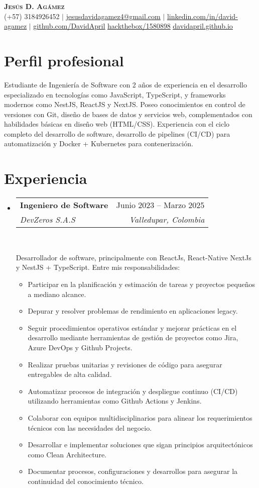 \documentclass[letterpaper,11pt]{article}
\makeatletter
\newcommand{\resumeItem}[1]{
  \item\small{
    {#1 \vspace{-2pt}}
  }
}
\newcommand{\resumeSubheading}[4]{
  \vspace{-2pt}\item
    \begin{tabular*}{0.97\textwidth}[t]{l@{\extracolsep{\fill}}r}
      \textbf{#1} & #2 \\
      \textit{\small#3} & \textit{\small #4} \\
    \end{tabular*}\vspace{-7pt}
}
\newcommand{\resumeSubHeadingListStart}{\begin{itemize}[leftmargin=0.15in, label={}]}
\newcommand{\resumeSubHeadingListEnd}{\end{itemize}}
\newcommand{\resumeItemListStart}{\begin{itemize}}
\newcommand{\resumeItemListEnd}{\end{itemize}\vspace{-5pt}}
\makeatother
\begin{document}
\begin{center}
    \textbf{\Huge \scshape Jesús D. Agámez} \\ \vspace{1pt}
    \small (+57) 3184926452 $|$ \href{mailto:jesusdavidagamez4@gmail.com}{\underline{jesusdavidagamez4@gmail.com}} $|$ 
    \href{https://linkedin.com/in/david-agamez}{\underline{linkedin.com/in/david-agamez}} $|$
    \href{https://github.com/DavidApril}{\underline{github.com/DavidApril}}
    \href{https://app.hackthebox.com/profile/1580898}{\underline{hackthebox/1580898}}
    \href{https://davidapril.github.io}{\underline{davidapril.github.io}}
\end{center}

\section{Perfil profesional}
    \par
    {Estudiante de Ingeniería de Software con 2 años de experiencia en el desarrollo especializado en tecnologías como JavaScript, TypeScript, y frameworks modernos como NestJS, ReactJS y NextJS. Poseo conocimientos en control de versiones con Git, diseño de bases de datos y servicios web, complementados con habilidades básicas en diseño web (HTML/CSS). Experiencia con el ciclo completo del desarrollo de software, desarrollo de pipelines (CI/CD) para automatización y Docker + Kubernetes para contenerización.}


\section{Experiencia}
  \resumeSubHeadingListStart
    \resumeSubheading
      {Ingeniero de Software}{Junio 2023 -- Marzo 2025}
      {DevZeros S.A.S}{Valledupar, Colombia}
      \
      \par{Desarrollador de software, principalmente con ReactJs, React-Native NextJs y NestJS  + TypeScript. Entre mis
      responsabilidades:}
    
      \resumeItemListStart
        \resumeItem{Participar en la planificación y estimación de tareas y proyectos pequeños a mediano alcance.}
        \resumeItem{Depurar y resolver problemas de rendimiento en aplicaciones legacy.}
        \resumeItem{Seguir procedimientos operativos estándar y mejorar prácticas en el desarrollo mediante herramientas de gestión de proyectos como Jira, Azure DevOps y Github Projects.}
        \resumeItem{Realizar pruebas unitarias y revisiones de código para asegurar entregables de alta calidad.}
        \resumeItem{Automatizar procesos de integración y despliegue continuo (CI/CD) utilizando herramientas como Github Actions y Jenkins.}
        \resumeItem{Colaborar con equipos multidisciplinarios para alinear los requerimientos técnicos con las necesidades del negocio.}
        \resumeItem{Desarrollar e implementar soluciones que sigan principios arquitectónicos como Clean Architecture.}
        \resumeItem{Documentar procesos, configuraciones y desarrollos para asegurar la continuidad del conocimiento técnico.}
      \resumeItemListEnd
    \resumeSubHeadingListEnd
\end{document}
